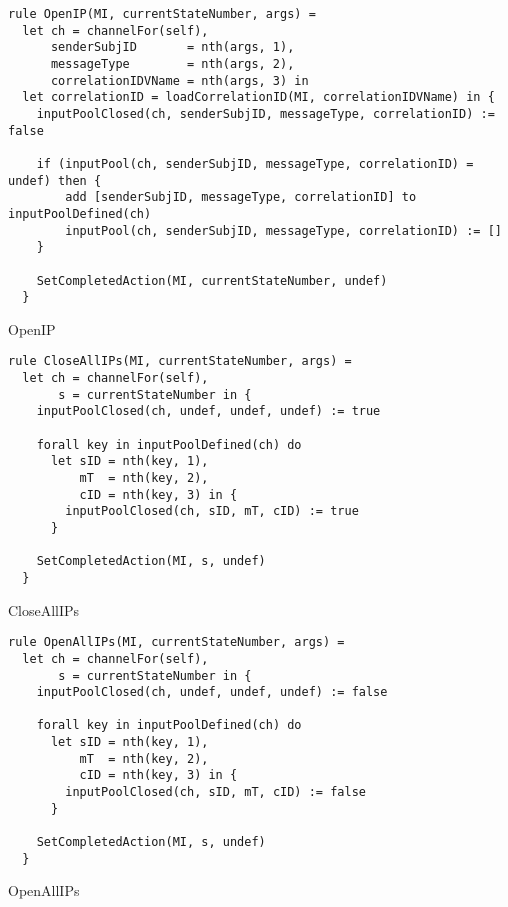 \begin{listing}[H]
\begin{verbatim}
rule OpenIP(MI, currentStateNumber, args) =
  let ch = channelFor(self),
      senderSubjID       = nth(args, 1),
      messageType        = nth(args, 2),
      correlationIDVName = nth(args, 3) in
  let correlationID = loadCorrelationID(MI, correlationIDVName) in {
    inputPoolClosed(ch, senderSubjID, messageType, correlationID) := false

    if (inputPool(ch, senderSubjID, messageType, correlationID) = undef) then {
        add [senderSubjID, messageType, correlationID] to inputPoolDefined(ch)
        inputPool(ch, senderSubjID, messageType, correlationID) := []
    }

    SetCompletedAction(MI, currentStateNumber, undef)
  }
\end{verbatim}
\caption{OpenIP}
\label{lst:asm:OpenIP}
\end{listing}




\begin{listing}[H]
\begin{verbatim}
rule CloseAllIPs(MI, currentStateNumber, args) =
  let ch = channelFor(self),
       s = currentStateNumber in {
    inputPoolClosed(ch, undef, undef, undef) := true

    forall key in inputPoolDefined(ch) do
      let sID = nth(key, 1),
          mT  = nth(key, 2),
          cID = nth(key, 3) in {
        inputPoolClosed(ch, sID, mT, cID) := true
      }

    SetCompletedAction(MI, s, undef)
  }
\end{verbatim}
\caption{CloseAllIPs}
\label{lst:asm:CloseAllIPs}
\end{listing}




\begin{listing}[H]
\begin{verbatim}
rule OpenAllIPs(MI, currentStateNumber, args) =
  let ch = channelFor(self),
       s = currentStateNumber in {
    inputPoolClosed(ch, undef, undef, undef) := false

    forall key in inputPoolDefined(ch) do
      let sID = nth(key, 1),
          mT  = nth(key, 2),
          cID = nth(key, 3) in {
        inputPoolClosed(ch, sID, mT, cID) := false
      }

    SetCompletedAction(MI, s, undef)
  }
\end{verbatim}
\caption{OpenAllIPs}
\label{lst:asm:OpenAllIPs}
\end{listing}




